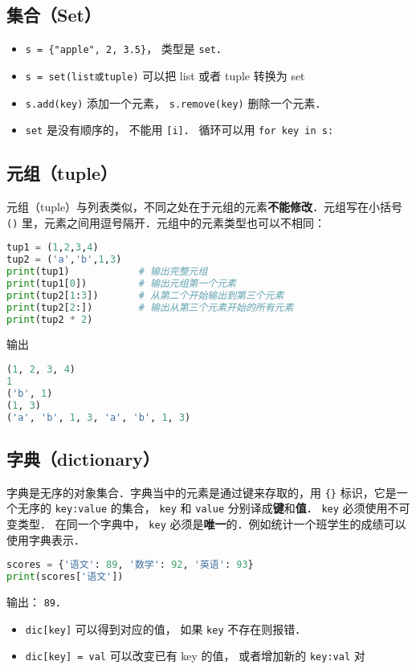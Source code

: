 \subsection{集合（Set）}
\begin{itemize}
\item \verb|s = {"apple", 2, 3.5}|， 类型是 \verb|set|． 
\item \verb|s = set(list或tuple)| 可以把 list 或者 tuple 转换为 set
\item \verb|s.add(key)| 添加一个元素， \verb|s.remove(key)| 删除一个元素．
\item \verb|set| 是没有顺序的， 不能用 \verb|[i]|． 循环可以用 \verb|for key in s:|
\end{itemize}


\subsection{元组（tuple）}
元组（tuple）与列表类似，不同之处在于元组的元素\textbf{不能修改}．元组写在小括号 \verb|()| 里，元素之间用逗号隔开．元组中的元素类型也可以不相同：
\begin{lstlisting}[language=python]
tup1 = (1,2,3,4)
tup2 = ('a','b',1,3)
print(tup1)            # 输出完整元组
print(tup1[0])         # 输出元组第一个元素
print(tup2[1:3])       # 从第二个开始输出到第三个元素
print(tup2[2:])        # 输出从第三个元素开始的所有元素
print(tup2 * 2)
\end{lstlisting}
输出
\begin{lstlisting}[language=python]
(1, 2, 3, 4)
1
('b', 1)
(1, 3)
('a', 'b', 1, 3, 'a', 'b', 1, 3)
\end{lstlisting}

\subsection{字典（dictionary）}
字典是无序的对象集合．字典当中的元素是通过键来存取的，用 \verb|{}| 标识，它是一个无序的 \verb|key:value| 的集合， \verb|key| 和 \verb|value| 分别译成\textbf{键}和\textbf{值}． \verb|key| 必须使用不可变类型． 在同一个字典中， \verb|key| 必须是\textbf{唯一}的．例如统计一个班学生的成绩可以使用字典表示．
\begin{lstlisting}[language=python]
scores = {'语文': 89, '数学': 92, '英语': 93}
print(scores['语文'])
\end{lstlisting}
输出： \verb|89|．

\begin{itemize}
\item \verb|dic[key]| 可以得到对应的值， 如果 \verb|key| 不存在则报错．
\item \verb|dic[key] = val| 可以改变已有 key 的值， 或者增加新的 \verb|key:val| 对
\end{itemize}
